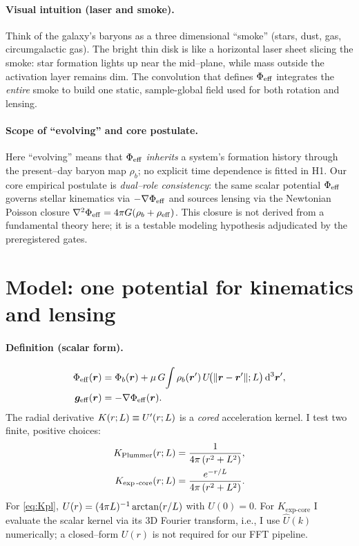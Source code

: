 		\paragraph{Visual intuition (laser and smoke).}
		Think of the galaxy’s baryons as a three dimensional “smoke” (stars, dust, gas, circumgalactic gas). The bright thin disk is like a horizontal laser sheet slicing the smoke: star formation lights up near the mid--plane, while mass outside the activation layer remains dim. The convolution that defines $\Phi_{\rm eff}$ integrates the \emph{entire} smoke to build one static, sample-global field used for both rotation and lensing.
		\paragraph{Scope of “evolving” and core postulate.}
		Here “evolving” means that $\Phi_{\rm eff}$ \emph{inherits} a system’s formation history through the present--day baryon map $\rho_b$; no explicit time dependence is fitted in H1. Our core empirical postulate is \emph{dual--role consistency}: the same scalar potential $\Phi_{\rm eff}$ governs stellar kinematics via $-\nabla\Phi_{\rm eff}$ and sources lensing via the Newtonian Poisson closure $\nabla^2\Phi_{\rm eff}=4\pi G(\rho_b+\rho_{\rm eff})$. This closure is not derived from a fundamental theory here; it is a testable modeling hypothesis adjudicated by the preregistered gates.
		
		\section{Model: one potential for kinematics and lensing}\label{sec:model}
		\paragraph{Definition (scalar form).}
		
		\begin{align}
			\Phi_{\mathrm{eff}}(\bm{r}) &= \Phi_b(\bm{r})
			+\mu\,G\!\int \rho_b(\bm{r}')\,U\!\big(\lVert\bm{r}-\bm{r}'\rVert;L\big)\,\mathrm{d}^3\bm{r}', \label{eq:phi_eff}\\
			\bm{g}_{\mathrm{eff}}(\bm{r}) &= -\nabla\Phi_{\mathrm{eff}}(\bm{r}). \label{eq:geff}
		\end{align}
		The radial derivative $K(r;L)\equiv U'(r;L)$ is a \emph{cored} acceleration kernel. I test two finite, positive choices:
		\begin{align}
			K_{\text{Plummer}}(r;L) &= \frac{1}{4\pi\,(r^2+L^2)}, \label{eq:Kpl}\\
			K_{\exp\text{-core}}(r;L) &= \frac{e^{-r/L}}{4\pi\,(r^2+L^2)}. \label{eq:KexpCore}
		\end{align}
		For \eqref{eq:Kpl}, $U(r)=(4\pi L)^{-1}\arctan(r/L)$ with $U(0)=0$. For $K_{\exp\text{-core}}$ I evaluate the scalar kernel via its 3D Fourier transform, i.e., I use $\widehat{U}(k)$ numerically; a closed–form $U(r)$ is not required for our FFT pipeline.
		
